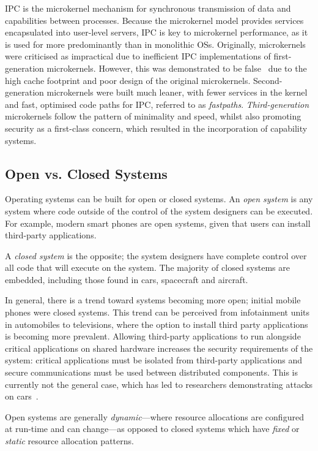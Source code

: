 \gls{IPC} is the microkernel mechanism for synchronous transmission of data and capabilities between
processes. Because the microkernel model provides services encapsulated into user-level servers,
\gls{IPC} is key to microkernel performance, as it is used for more predominantly than in monolithic
\glspl{OS}. Originally, microkernels were criticised as impractical due to inefficient IPC
implementations of first-generation microkernels. However, this was demonstrated to be
false~\citep{Hartig_HLSW_97} due to the high cache footprint and poor design of the original
microkernels. Second-generation microkernels were built much leaner, with fewer services in the
kernel and fast, optimised code paths for IPC, referred to as \emph{fastpaths}. 
\emph{Third-generation} microkernels follow the pattern of minimality and speed, whilst also
promoting security as a first-class concern, which resulted in the incorporation of capability
systems. 

\subsection{Open vs. Closed Systems}

Operating systems can be built for open or closed systems.  An \emph{open system} is any system
where code outside of the control of the system designers can be executed. For example, modern
smart phones are open systems, given that users can install third-party applications.

A \emph{closed system} is the opposite; the system designers have complete control over all code
that will execute on the system.  The majority of closed systems are embedded, including those found
in cars, spacecraft and aircraft.

In general, there is a trend toward systems becoming more open; initial mobile phones were closed
systems.  This trend can be perceived from infotainment units in automobiles to televisions, where
the option to install third party applications is becoming more prevalent.  Allowing third-party
applications to run alongside critical applications on shared hardware increases the security
requirements of the system: critical applications must be isolated from third-party applications and
secure communications must be used between distributed components.  This is currently not the
general case, which has led to researchers demonstrating attacks on
cars~\citep{Checkoway_MKASSKCRK_11}.

Open systems are generally \emph{dynamic}---where resource allocations are configured at run-time
and can change---as opposed to closed systems which have \emph{fixed} or \emph{static} resource
allocation patterns.

